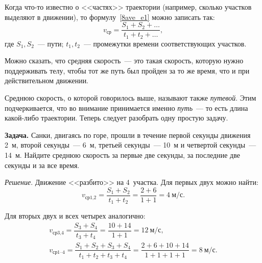 \documentclass[main.tex]{subfiles}
\begin{document}
Когда что-то известно о <<частях>> траектории (например, сколько участков выделяют в движении), то формулу~\eqref{8ave_e1} можно записать так:
\begin{equation*}
    v_\text{ср}=\dfrac{S_\text{1}+S_\text{2}+\ldots}{t_\text{1}+t_\text{2}+\ldots},
\end{equation*}
где $S_\text{1},S_\text{2}$~--- пути; $t_\text{1},t_\text{2}$~--- промежутки времени соответствующих участков.

Можно сказать, что средняя скорость~--- это такая скорость, которую нужно поддерживать телу, чтобы тот же путь был пройден за то же время, что и при действительном движении. 

Среднюю скорость, о которой говорилось выше, называют также \emph{путевой}. Этим подчеркивается, что во внимание принимается именно \emph{путь}~--- то есть длина какой-либо траектории. Теперь следует разобрать одну простую задачу.

\medskip

\noindent\textbf{Задача.} Санки, двигаясь по горе, прошли в течение первой секунды движения 2~м, второй секунды~--- 6~м, третьей секунды~--- 10~м и четвертой секунды~--- 14~м. Найдите среднюю скорость за первые две секунды, за последние две секунды и за все время.

\smallskip

\noindent\emph{Решение}. Движение <<разбито>> на 4~участка. Для первых двух можно найти:
\begin{equation*}
    v_\text{ср1,2}=\dfrac{S_\text{1}+S_\text{2}}{t_\text{1}+t_\text{2}}=\dfrac{2+6}{1+1}=4\ \text{м$/$с}.
\end{equation*}

Для вторых двух и всех четырех аналогично:
\begin{gather*}
    v_\text{ср3,4}=\dfrac{S_\text{3}+S_\text{4}}{t_\text{3}+t_\text{4}}=\dfrac{10+14}{1+1}=12\ \text{м$/$с},\\
    v_\text{ср1--4}=\dfrac{S_\text{1}+S_\text{2}+S_\text{3}+S_\text{4}}{t_\text{1}+t_\text{2}+t_\text{3}+t_\text{4}}=\dfrac{2+6+10+14}{1+1+1+1}=8\ \text{м$/$с}.
\end{gather*}

 
\end{document}
